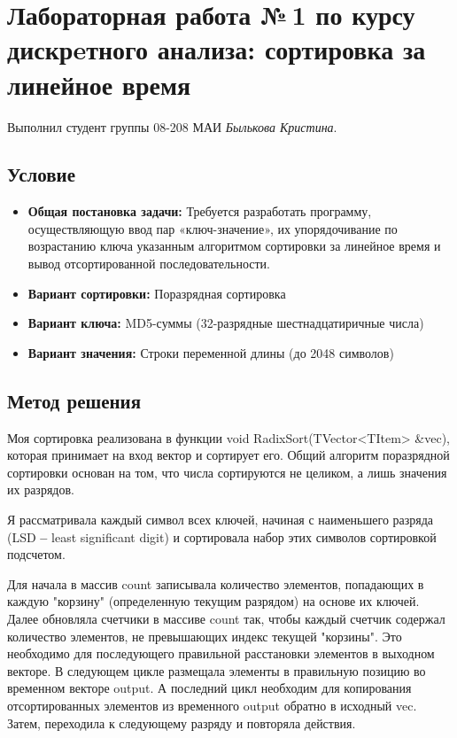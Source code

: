 \documentclass[12pt]{article}
\begin{document}
\section*{Лабораторная работа №\,1 по курсу дискрeтного анализа: сортировка за линейное время}

\noindent Выполнил студент группы 08-208 МАИ \textit{Былькова Кристина}.

\subsection*{Условие}

\begin{itemize}
\item \textbf{Общая постановка задачи:} Требуется разработать программу, осуществляющую ввод пар «ключ-значение», их упорядочивание по возрастанию ключа указанным алгоритмом сортировки за линейное время и вывод отсортированной последовательности.

\item \textbf{Вариант сортировки:} Поразрядная сортировка

\item \textbf{Вариант ключа:} MD5-суммы (32-разрядные шестнадцатиричные числа)

\item \textbf{Вариант значения:} Строки переменной длины (до 2048 символов)
\end{itemize}

\subsection*{Метод решения}

Моя сортировка реализована в функции void RadixSort(TVector<TItem> \&vec), которая принимает на вход вектор и сортирует его. Общий алгоритм поразрядной сортировки основан на том, что числа сортируются не целиком, а лишь значения их разрядов.

Я рассматривала каждый символ всех ключей, начиная с наименьшего разряда (LSD \textbf{--} least significant digit) и сортировала набор этих символов сортировкой подсчетом. 

Для начала в массив count записывала количество элементов, попадающих в каждую "корзину" (определенную текущим разрядом) на основе их ключей. Далее обновляла счетчики в массиве count так, чтобы каждый счетчик содержал количество элементов, не превышающих индекс текущей "корзины". Это необходимо для последующего правильной расстановки элементов в выходном векторе. В следующем цикле размещала элементы в правильную позицию во временном векторе output. А последний цикл необходим для копирования отсортированных элементов из временного output обратно в исходный vec. Затем, переходила к следующему разряду и повторяла действия.
\end{document}
